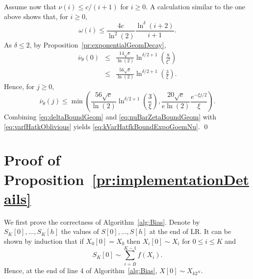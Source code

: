 \documentclass[a4paper,11pt]{article}
\begin{document}
Assume now that  \(\nu(i)\le c/(i+1)\) for \(i\geq0\). A calculation similar to the one above shows that, for \(i\geq0\),\begin{equation*}\omega(i)\leq\frac{4c}{\ln^{2}(2)} \frac{\ln^{\delta}(i+2)}{i+1}.
\end{equation*} As \(\delta\leq2\), by Proposition~\ref{pr:exponentialGeomDecay},\begin{eqnarray*}
\overline{\nu}_{\theta}(0)&\leq&\frac{14\sqrt{c}}{\ln(2)}\ln^{\delta/2+1}\left(\frac{8}{\xi^{2}}\right)\\&\leq&{\frac{56\sqrt{c}}{\ln(2)}}\ln^{\delta/2+1}\left(\frac{3}{\xi}\right).
\end{eqnarray*}
Hence, for \(j\geq0\), 
\begin{equation}\label{eq:nuBarZetaBoundGeom}
\overline{\nu}_{\theta}(j)\leq \min\left({\frac{56\sqrt{c}}{\ln(2)}}\ln^{\delta/2+1}\left(\frac{3}{\xi}\right),{\frac{20\sqrt{c}}{e\ln(2)}}\frac{e^{-\xi j/2}}{\xi}\right).
\end{equation}
Combining \eqref{eq:deltaBoundGeom} and \eqref{eq:nuBarZetaBoundGeom} with  \eqref{eq:varfHatkOblivious} yields \eqref{eq:kVarHatfkBoundExpoGoemNu}. \qed
\section{Proof of Proposition~\ref{pr:implementationDetails}}
 We first prove the correctness of Algorithm~\ref{alg:Bias}. Denote by \(S_{K}[0],\dots,S_{K}[h]\)   the values of  \(S[0],\dots,S[h]\)  at the end of LR.  It can be shown by  induction that if \(X_{0}[0]= X_{0}\) then  \(X_{i}[0]\sim X_{i}\) for \(0\leq i\leq K\) and \begin{equation}\label{eq:Sout[0]}
S_{K}[0]\sim\sum ^{K-1}_{i=B}f(X_{i}).
\end{equation}  Hence, at the end of line 4 of Algorithm~\ref{alg:Bias},  \(X[0]\sim X_{k2^{N}}\). 

 
\end{document}
